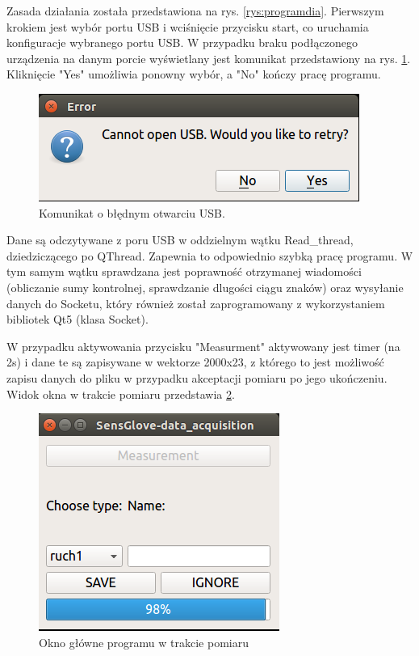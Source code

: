 \documentclass{article}
\begin{document}
Zasada działania została przedstawiona na rys. \ref{rys:programdia}. 
Pierwszym krokiem jest wybór portu USB i wciśnięcie przycisku start, co uruchamia konfiguracje wybranego portu USB. W przypadku braku podłączonego urządzenia na danym porcie wyświetlany jest komunikat przedstawiony na rys. \ref{rys:oknousb}. Kliknięcie "Yes" umożliwia ponowny wybór, a "No" kończy pracę programu.\\
\begin{figure}[h!]
    \begin{center}
    \includegraphics[scale=0.6]{oknousb.png}
    \caption{Komunikat o błędnym otwarciu USB.}
    \label{rys:oknousb}
    \end{center}
\end{figure}
Dane są odczytywane z poru USB w oddzielnym wątku Read\_thread, dziedziczącego po QThread. Zapewnia to odpowiednio szybką pracę programu. W tym samym wątku sprawdzana jest poprawność otrzymanej wiadomości (obliczanie sumy kontrolnej, sprawdzanie dlugości ciągu znaków) oraz wysyłanie danych do Socketu, który również został zaprogramowany z wykorzystaniem bibliotek Qt5 (klasa Socket).

W przypadku aktywowania przycisku "Measurment" aktywowany jest timer (na 2s) i dane te są zapisywane w wektorze 2000x23, z którego to jest możliwość zapisu danych do pliku w przypadku akceptacji pomiaru po jego ukończeniu. Widok okna w trakcie pomiaru przedstawia \ref{rys:oknopomiar}.
\begin{figure}[h!]
    \centering
    \includegraphics[scale=0.6]{oknopomiar.png}
    \caption{Okno główne programu w trakcie pomiaru}
    \label{rys:oknopomiar}
\end{figure}
\end{document}
